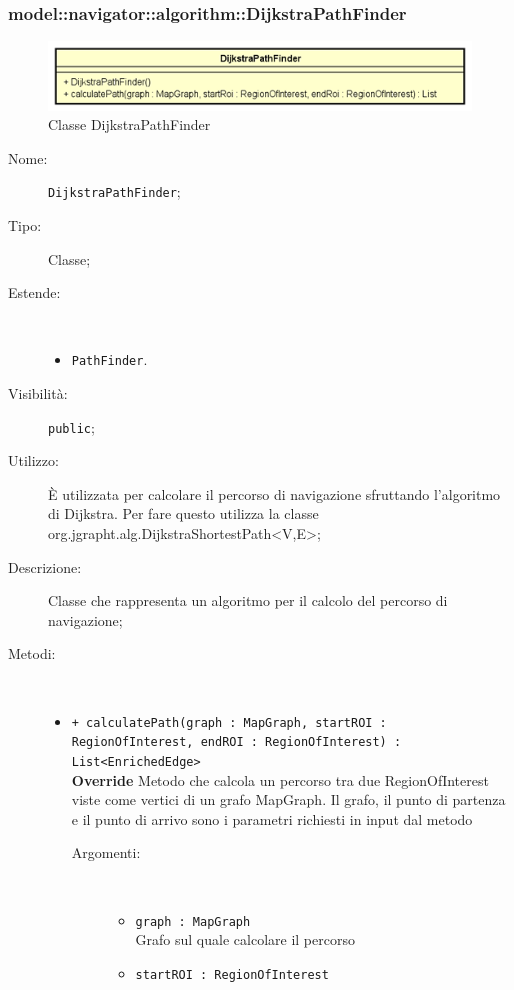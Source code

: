 \documentclass[../DefinizioneDiProdotto.tex]{subfiles}
\begin{document}
\subsubsection{model::navigator::algorithm::DijkstraPathFinder}

    \begin{figure}[H]
        \centering
        \includegraphics{img/DijkstraPathFinder.png}
        \caption{Classe DijkstraPathFinder}\label{fig:model::navigator::algorithm::DijkstraPathFinder} 
    \end{figure}
    \begin{description}
\item[Nome:] \texttt{DijkstraPathFinder};
\item[Tipo:] Classe;
\item[Estende:] \
\begin{itemize}
\item \texttt{PathFinder}.
\end{itemize}
\item[Visibilità:] \texttt{public};
\item[Utilizzo:] È utilizzata per calcolare il percorso di navigazione sfruttando l'algoritmo di Dijkstra. Per fare questo utilizza la classe\\org.jgrapht.alg.DijkstraShortestPath<V,E>;
\item[Descrizione:] Classe che rappresenta un algoritmo per il calcolo del percorso di navigazione;
\item[Metodi:] \
\begin{itemize}
\item \texttt{+ calculatePath(graph : MapGraph, startROI : RegionOfInterest, endROI : RegionOfInterest) : List<EnrichedEdge>}\\
\textbf{Override} Metodo che calcola un percorso tra due RegionOfInterest viste come vertici di un grafo MapGraph. Il grafo, il punto di partenza e il punto di arrivo sono i parametri richiesti in input dal metodo
 \begin{description}
\item[Argomenti:] \
\begin{itemize}
\item \texttt{graph : MapGraph}\\
Grafo sul quale calcolare il percorso\item \texttt{startROI : RegionOfInterest}\\

\end{itemize}
\end{description}
\end{itemize}
\end{description}
\end{document}
